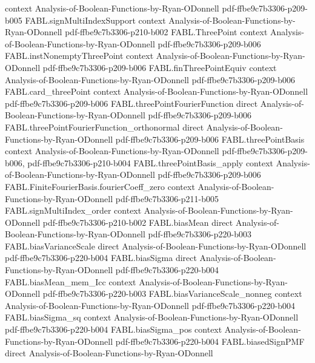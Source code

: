 \begin{theorem}
  {context}
  {Analysis-of-Boolean-Functions-by-Ryan-ODonnell}
  {pdf-ffbe9c7b3306-p209-b005}
\proofstep
  {FABL.signMultiIndexSupport}
  {context}
  {Analysis-of-Boolean-Functions-by-Ryan-ODonnell}
  {pdf-ffbe9c7b3306-p210-b002}
\proofstep
  {FABL.ThreePoint}
  {context}
  {Analysis-of-Boolean-Functions-by-Ryan-ODonnell}
  {pdf-ffbe9c7b3306-p209-b006}
\proofstep
  {FABL.instNonemptyThreePoint}
  {context}
  {Analysis-of-Boolean-Functions-by-Ryan-ODonnell}
  {pdf-ffbe9c7b3306-p209-b006}
\proofstep
  {FABL.finThreePointEquiv}
  {context}
  {Analysis-of-Boolean-Functions-by-Ryan-ODonnell}
  {pdf-ffbe9c7b3306-p209-b006}
\proofstep
  {FABL.card_threePoint}
  {context}
  {Analysis-of-Boolean-Functions-by-Ryan-ODonnell}
  {pdf-ffbe9c7b3306-p209-b006}
\proofstep
  {FABL.threePointFourierFunction}
  {direct}
  {Analysis-of-Boolean-Functions-by-Ryan-ODonnell}
  {pdf-ffbe9c7b3306-p209-b006}
\proofstep
  {FABL.threePointFourierFunction_orthonormal}
  {direct}
  {Analysis-of-Boolean-Functions-by-Ryan-ODonnell}
  {pdf-ffbe9c7b3306-p209-b006}
\proofstep
  {FABL.threePointBasis}
  {context}
  {Analysis-of-Boolean-Functions-by-Ryan-ODonnell}
  {pdf-ffbe9c7b3306-p209-b006,
    pdf-ffbe9c7b3306-p210-b004}
\proofstep
  {FABL.threePointBasis_apply}
  {context}
  {Analysis-of-Boolean-Functions-by-Ryan-ODonnell}
  {pdf-ffbe9c7b3306-p209-b006}
\proofstep
  {FABL.FiniteFourierBasis.fourierCoeff_zero}
  {context}
  {Analysis-of-Boolean-Functions-by-Ryan-ODonnell}
  {pdf-ffbe9c7b3306-p211-b005}
\proofstep
  {FABL.signMultiIndex_order}
  {context}
  {Analysis-of-Boolean-Functions-by-Ryan-ODonnell}
  {pdf-ffbe9c7b3306-p210-b002}
\proofstep
  {FABL.biasMean}
  {direct}
  {Analysis-of-Boolean-Functions-by-Ryan-ODonnell}
  {pdf-ffbe9c7b3306-p220-b003}
\proofstep
  {FABL.biasVarianceScale}
  {direct}
  {Analysis-of-Boolean-Functions-by-Ryan-ODonnell}
  {pdf-ffbe9c7b3306-p220-b004}
\proofstep
  {FABL.biasSigma}
  {direct}
  {Analysis-of-Boolean-Functions-by-Ryan-ODonnell}
  {pdf-ffbe9c7b3306-p220-b004}
\proofstep
  {FABL.biasMean_mem_Icc}
  {context}
  {Analysis-of-Boolean-Functions-by-Ryan-ODonnell}
  {pdf-ffbe9c7b3306-p220-b003}
\proofstep
  {FABL.biasVarianceScale_nonneg}
  {context}
  {Analysis-of-Boolean-Functions-by-Ryan-ODonnell}
  {pdf-ffbe9c7b3306-p220-b004}
\proofstep
  {FABL.biasSigma_sq}
  {context}
  {Analysis-of-Boolean-Functions-by-Ryan-ODonnell}
  {pdf-ffbe9c7b3306-p220-b004}
\proofstep
  {FABL.biasSigma_pos}
  {context}
  {Analysis-of-Boolean-Functions-by-Ryan-ODonnell}
  {pdf-ffbe9c7b3306-p220-b004}
\proofstep
  {FABL.biasedSignPMF}
  {direct}
  {Analysis-of-Boolean-Functions-by-Ryan-ODonnell}

\end{theorem}
